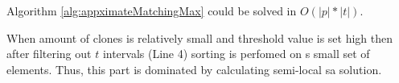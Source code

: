 \begin{corollary}
Algorithm \ref{alg:appximateMatchingMax} could  be solved in 
$O(|p| * |t|)$.

When amount of clones is relatively small and threshold value is set high  then after filtering out $t$ intervals (Line 4) sorting is perfomed on s small set of elements.
Thus, this part is dominated by calculating semi-local sa solution.
\end{corollary}







  


 
